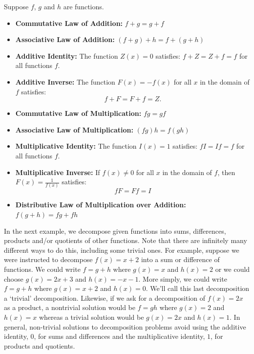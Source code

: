 \documentclass{ximera}
\begin{document}

\begin{theorem}  \label{functionarithmeticprops}  Suppose $f$, $g$ and $h$ are functions.

\begin{itemize}

\item   \textbf{Commutative Law of Addition:} $f+g =g+f$

\item  \textbf{Associative Law of Addition:} $(f+g) + h = f+(g+h)$

\item  \textbf{Additive Identity:}  The function $Z(x) = 0$ satisfies:  $f+Z = Z+f = f$ for all functions $f$.

\item  \textbf{Additive Inverse:}  The function $F(x) = -f(x)$ for all $x$ in the domain of $f$ satisfies:  \[ f+F=F+f=Z.\] 

\item  \textbf{Commutative Law of Multiplication:} $fg = gf$

\item  \textbf{Associative Law of Multiplication:} $(fg)h =f(gh)$

\item  \textbf{Multiplicative Identity:}  The function $I(x) = 1$ satisfies:  $fI = If = f$ for all functions $f$.

\item  \textbf{Multiplicative Inverse:}  If $f(x) \neq 0$ for all $x$ in the domain of $f$, then $F(x) = \frac{1}{f(x)}$ satisfies: \[ fF=Ff = I\]

\item  \textbf{Distributive Law of Multiplication over Addition:}  $f(g+h) = fg+fh$

\end{itemize}

\end{theorem}


In the next example, we decompose given functions into sums, differences, products and/or quotients of other functions.  Note that there are infinitely many different ways to do this, including some trivial ones.  For example, suppose we were instructed to decompose $f(x) = x+2$ into a sum or difference of functions.  We could write $f = g+h$ where $g(x) = x$ and $h(x) = 2$ or we could choose $g(x) = 2x+3$ and $h(x) = -x-1$.  More simply, we could write $f = g+h$ where $g(x) = x+2$ and $h(x) = 0$.  We'll call this last decomposition a `trivial' decomposition.  Likewise, if we ask for a decomposition of $f(x) = 2x$ as a product, a nontrivial solution would be $f = gh$ where $g(x) = 2$ and $h(x) = x$ whereas a trivial solution would be $g(x) = 2x$ and $h(x) = 1$.  In general, non-trivial solutions to decomposition problems avoid using the additive identity, $0$,  for sums and differences and the multiplicative identity, $1$, for products and quotients.
\end{document}
